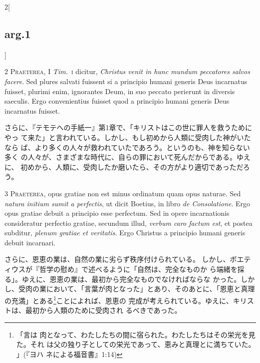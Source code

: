\documentclass[paper=a4paper,fontsize=10pt,jafontsize=9pt,titlepage]{jlreq}
\begin{document}
\begin{paracol}{2}[\subsection{arg.1}]

2 {\scshape Praeterea}, I {\itshape Tim.}~{\scshape i} dicitur, {\itshape Christus
venit in hunc mundum peccatores salvos facere}. Sed plures salvati
fuissent si a principio humani generis Deus incarnatus fuisset, plurimi
enim, ignorantes Deum, in suo peccato perierunt in diversis
saeculis. Ergo convenientius fuisset quod a principio humani generis
Deus incarnatus fuisset.

\switchcolumn

さらに、『テモテへの手紙一』第1章で、「キリストはこの世に罪人を救うためにやっ
 て来た」と言われている。しかし、もし初めから人類に受肉した神がいたなら
 ば、より多くの人々が救われていたであろう。というのも、神を知らない多く
 の人々が、さまざまな時代に、自らの罪において死んだからである。ゆえに、
 初めから、人類に、受肉したか磨いたら、その方がより適切であっただろう。


3 {\scshape Praeterea}, opus gratiae non est minus
ordinatum quam opus naturae. Sed {\itshape natura initium sumit a perfectis}, ut
dicit Boetius, in libro {\itshape de Consolatione}. Ergo opus gratiae debuit a
principio esse perfectum. Sed in opere incarnationis consideratur
perfectio gratiae, secundum illud, {\itshape verbum caro factum est}, et postea
subditur, {\itshape plenum gratiae et veritatis}. Ergo Christus a principio humani
generis debuit incarnari.

\switchcolumn

さらに、恩恵の業は、自然の業に劣らず秩序付けられている。
しかし、ボエティウスが『哲学の慰め』で述べるように「自然は、完全なものか
 ら端緒を採る」。ゆえに、恩恵の業は、最初から完全なものでなければならな
 かった。しかし、受肉の業において、「言葉が肉となった」とあり、そのあとに、「恩恵と真理の充満」とある\footnote{「言は
 肉となって、わたしたちの間に宿られた。わたしたちはその栄光を見た。それ
 は父の独り子としての栄光であって、恵みと真理とに満ちていた。 」(『ヨハ
 ネによる福音書』1:14)}ことによれば、恩恵の
 完成が考えられている。ゆえに、キリストは、最初から人類のために受肉され
 るべきであった。

\switchcolumn*[\subsection{s.c.}]


\end{paracol}
\end{document}
